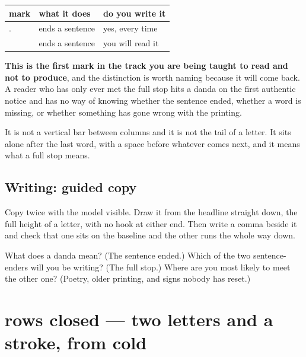 \begin{grammarlens}[title={Grammar Lens: a mark to recognise rather than to reach for}]
\noindent
\begin{tabularx}{\linewidth}{@{}>{\raggedright\arraybackslash}X>{\raggedright\arraybackslash}X>{\raggedright\arraybackslash}X@{}}
\toprule
\textbf{mark} & \textbf{what it does} & \textbf{do you write it} \\
\midrule
. & ends a sentence & yes, every time \\
\mr{।} & ends a sentence & you will read it \\
\bottomrule
\end{tabularx}

\textbf{This is the first mark in the track you are being taught to read and not to produce}, and the distinction is worth naming because it will come back. A reader who has only ever met the full stop hits a danda on the first authentic notice and has no way of knowing whether the sentence ended, whether a word is missing, or whether something has gone wrong with the printing.

It is not a vertical bar between columns and it is not the tail of a letter. It sits alone after the last word, with a space before whatever comes next, and it means what a full stop means.
\end{grammarlens}

\subsection*{Writing: guided copy}
Copy \textbf{} twice with the model visible. Draw it from the headline straight down, the full height of a letter, with no hook at either end. Then write a comma beside it and check that one sits on the baseline and the other runs the whole way down.

\begin{tcolorbox}[breakable,colback=teal!4,colframe=teal!35!black,title={Before you move on}]
What does a danda mean? (The sentence ended.) Which of the two sentence-enders will you be writing? (The full stop.) Where are you most likely to meet the other one? (Poetry, older printing, and signs nobody has reset.)
\end{tcolorbox}
\section[rows closed (olī pūrṇa)]{rows closed — two letters and a stroke, from cold}

